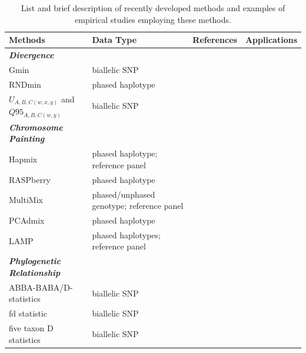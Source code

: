 \documentclass[11pt]{article}
\begin{document}
\begin{table}[b]

\begin{center}
\caption{List and brief description of recently developed methods and examples of empirical studies employing these methods.} \label{tab:tools}
\begin{tabularx}{\textwidth}{llll}
\\\toprule  
\rowcolor{white}
{\bf Methods}	& {\bf Data Type } &	{\bf References} &  {\bf Applications } \\ \midrule

\rowcolor{gray!25}
{\emph{\bf Divergence}} &   &   &   \\
\rowcolor{gray!25}
Gmin &	biallelic SNP	&  \cite{geneva2015}	 &  \cite{kingan2015}\\
\rowcolor{gray!25}
RNDmin	& phased haplotype	& \cite{rosenzweig2016} &  \cite{roda2017} \\
\rowcolor{gray!25}
$U_{A,B,C(w,x,y)}$ and $Q95_{A,B,C(w,y)}$ & biallelic SNP & \cite{Racimo2015} & \cite{sams2016} \\

\rowcolor{white}
{\emph{\bf Chromosome Painting}} &   &   &   \\
\rowcolor{white}
Hapmix	& phased haplotype; reference panel		& \cite{Price2009}	&  \cite{Hufford2013, suarez2016} \\ 
\rowcolor{white}
RASPberry &	phased haplotype &	\cite{wegmann2011}	 & \cite{christe2016} \\
\rowcolor{white}
MultiMix & phased/unphased genotype; reference panel &	\cite{churchhouse2013} &	\cite{eyheramendy2015} \\
\rowcolor{white}
PCAdmix	 & phased haplotype	 & \cite{brisbin2012pcadmix}	 &  \cite{pugach2016complex, moreno2014genetics} \\
\rowcolor{white}
LAMP  &	phased haplotypes; reference panel	 & \cite{sankararaman2008}	 & \cite{patterson2012} \\

\rowcolor{gray!25}
{\emph{\bf Phylogenetic Relationship}} &   &   &   \\
\rowcolor{gray!25}
ABBA-BABA/D-statistics	 & biallelic SNP  &	\cite{durand2011}	 &  \cite{heliconius2012} \\
\rowcolor{gray!25}
fd statistic &	biallelic SNP &	\cite{martin2015}  &	\cite{malinsky2015, zhang2016genome} \\ 
\rowcolor{gray!25}
five taxon D statistics	& biallelic SNP	&  \cite{pease2015}	& \cite{fontaine2015, pease2016} \\

\end{tabularx}
\end{center}
\end{table} 
\end{document}
